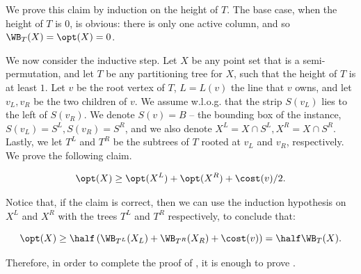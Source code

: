 \documentclass{toc}
\begin{document}
We prove this claim by induction on the height of $T$. 
The base case, when the height of $T$ is $0$, is obvious: there is only one active column, and so $\WB_T(X) = \opt(X) = 0$. 



We now consider the inductive step.
Let $X$ be any point set that is a semi-permutation, and let $T$ be any partitioning tree for $X$, such that the height of $T$ is at least $1$. Let $v$ be the root vertex of $T$, $L=L(v)$ the line that $v$ owns, and let $v_L,v_R$ be the two children of $v$. We assume w.l.o.g. that 
the strip $S(v_L)$ lies to the left of $S(v_R)$. We denote $S(v)=B$ -- the bounding box of the instance, $S(v_L)=S^L,S(v_R)=S^R$, and we also denote $X^L=X\cap S^L,X^R=X\cap S^R$. Lastly, we let $T^L$ and $T^R$ be the subtrees of $T$ rooted at $v_L$ and $v_R$, respectively.
We prove the following claim.

\begin{claim}\label{claim: ind step}
	\[\opt(X)\geq \opt(X^L)+\opt(X^R)+\cost(v)/2.\]
	\end{claim}

Notice that, if the claim is correct, then we can use the induction hypothesis on $X^L$ and $X^R$ with the trees $T^L$ and $T^R$ respectively, to conclude that:

\[\opt(X)\geq \half \left(\WB_{T^L}(X_L)+\WB_{T^R}(X_R)+\cost(v)\right )=\half \WB_T(X).\]

Therefore, in order to complete the proof of , it is enough to prove .
\end{document}
